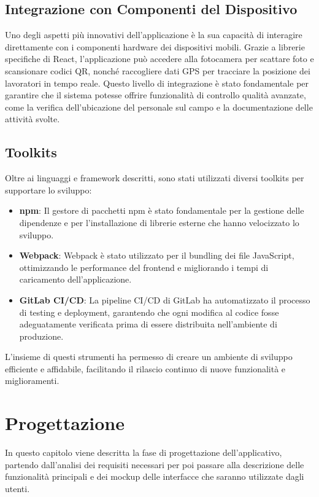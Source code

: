 \documentclass[twoside]{supsistudent}
\begin{document}
\section{Integrazione con Componenti del Dispositivo}

Uno degli aspetti più innovativi dell'applicazione è la sua capacità di interagire direttamente con i componenti hardware dei dispositivi mobili. Grazie a librerie specifiche di React, l'applicazione può accedere alla fotocamera per scattare foto e scansionare codici QR, nonché raccogliere dati GPS per tracciare la posizione dei lavoratori in tempo reale. Questo livello di integrazione è stato fondamentale per garantire che il sistema potesse offrire funzionalità di controllo qualità avanzate, come la verifica dell'ubicazione del personale sul campo e la documentazione delle attività svolte.

\section{Toolkits}

Oltre ai linguaggi e framework descritti, sono stati utilizzati diversi toolkits per supportare lo sviluppo:

\begin{itemize}
  \item \textbf{npm}: Il gestore di pacchetti npm è stato fondamentale per la gestione delle dipendenze e per l'installazione di librerie esterne che hanno velocizzato lo sviluppo.
  \item \textbf{Webpack}: Webpack è stato utilizzato per il bundling dei file JavaScript, ottimizzando le performance del frontend e migliorando i tempi di caricamento dell'applicazione.
  \item \textbf{GitLab CI/CD}: La pipeline CI/CD di GitLab ha automatizzato il processo di testing e deployment, garantendo che ogni modifica al codice fosse adeguatamente verificata prima di essere distribuita nell'ambiente di produzione.
\end{itemize}

L'insieme di questi strumenti ha permesso di creare un ambiente di sviluppo efficiente e affidabile, facilitando il rilascio continuo di nuove funzionalità e miglioramenti.

\chapter{Progettazione}

In questo capitolo viene descritta la fase di progettazione dell’applicativo, partendo dall'analisi dei requisiti necessari per poi passare alla descrizione delle funzionalità principali e dei mockup delle interfacce che saranno utilizzate dagli utenti.
\end{document}
